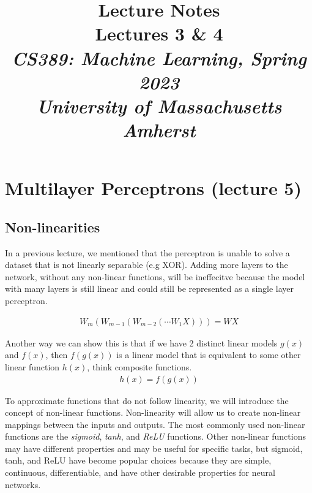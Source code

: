 \documentclass[11pt]{article}
\numberwithin{equation}{section}
\theoremstyle{definition}%
\begin{document}
\noindent
\title{Lecture Notes\\\vspace{0em}
\large Lectures 3 \& 4\\
\normalsize \emph{CS389: Machine Learning, Spring 2023}\\
\emph{University of Massachusetts Amherst}
\date{\smallheader}
}
\maketitle

\section{Multilayer Perceptrons (lecture 5)}

\subsection{Non-linearities}


In a previous lecture, we mentioned that the perceptron is unable to solve a dataset that is not linearly separable (e.g XOR). Adding more layers to the network, without any non-linear functions, will be ineffecitve because the model with many layers is still linear and could still be represented as a single layer perceptron.

\begin{align}
    W_m(W_{m-1}(W_{m-2}(\cdots W_{1} X))) = WX
\end{align}

Another way we can show this is that if we have 2 distinct linear models $g(x)$ and $f(x)$, then $f(g(x))$ is a linear model that is equivalent to some other linear function $h(x)$, think composite functions.
\begin{align}
    h(x) = f(g(x))
\end{align}

To approximate functions that do not follow linearity, we will introduce the concept of non-linear functions. Non-linearity will allow us to create non-linear mappings between the inputs and outputs. The most commonly used non-linear functions are the \emph{sigmoid}, \emph{tanh}, and \emph{ReLU} functions. Other non-linear functions may have different properties and may be useful for specific tasks, but sigmoid, tanh, and ReLU have become popular choices because they are simple, continuous, differentiable, and have other desirable properties for neural networks.
\end{document}
